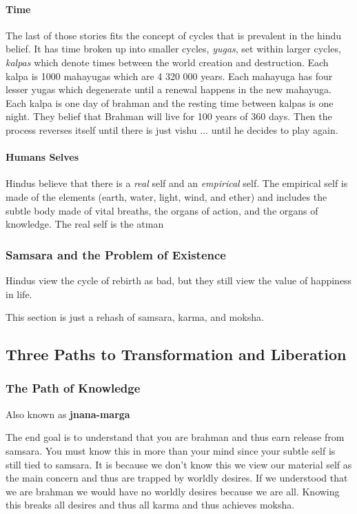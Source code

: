 \documentclass{article}
\begin{document}
\paragraph{Time}
\label{par:time}
The last of those stories fits the concept of cycles that is prevalent in the hindu belief. It has time broken up into smaller cycles, \emph{yugas}, set within larger cycles, \emph{kalpas} which denote times between the world creation and destruction. Each kalpa is 1000 mahayugas which are 4 320 000 years. Each mahayuga has four lesser yugas which degenerate until a renewal happens in the new mahayuga. Each kalpa is one day of brahman and the resting time between kalpas is one night. They belief that Brahman will live for 100 years of 360 days. Then the process reverses itself until there is just vishu ... until he decides to play again.

\paragraph{Humans Selves}
\label{par:humans}
Hindus believe that there is a \emph{real} self and an \emph{empirical} self. The empirical self is made of the elements (earth, water, light, wind, and ether) and includes the subtle body made of vital breaths, the organs of action, and the organs of knowledge. The real self is the atman

\subsubsection{Samsara and the Problem of Existence}
\label{ssub:samsara_and_the_problem_of_existence}
Hindus view the cycle of rebirth as bad, but they still view the value of happiness in life.

This section is just a rehash of samsara, karma, and moksha.

\subsection{Three Paths to Transformation and Liberation}
\label{sub:three_paths_to_transformation_and_liberation}
\subsubsection{The Path of Knowledge}
\label{ssub:the_path_of_knowledge}
Also known as \textbf{jnana-marga}

The end goal is to understand that you are brahman and thus earn release from samsara. You must know this in more than your mind since your subtle self is still tied to samsara. It is because we don't know this we view our material self as the main concern and thus are trapped by worldly desires. If we understood that we are brahman we would have no worldly desires because we are all.  Knowing this breaks all desires and thus all karma and thus achieves moksha.
\end{document}
